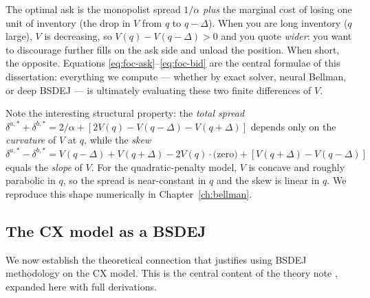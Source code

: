 \begin{intuition}
The optimal ask is the monopolist spread $1/\alpha$ \emph{plus} the marginal cost of losing one unit of inventory (the drop in $V$ from $q$ to $q - \Delta$). When you are long inventory ($q$ large), $V$ is decreasing, so $V(q) - V(q - \Delta) > 0$ and you quote \emph{wider}: you want to discourage further fills on the ask side and unload the position. When short, the opposite. Equations \eqref{eq:foc-ask}--\eqref{eq:foc-bid} are the central formulae of this dissertation: everything we compute --- whether by exact solver, neural Bellman, or deep BSDEJ --- is ultimately evaluating these two finite differences of $V$.

\medskip

Note the interesting structural property: the \emph{total spread} $\delta^{a, *} + \delta^{b, *} = 2/\alpha + [2V(q) - V(q - \Delta) - V(q + \Delta)]$ depends only on the \emph{curvature} of $V$ at $q$, while the \emph{skew} $\delta^{a, *} - \delta^{b, *} = V(q - \Delta) + V(q + \Delta) - 2 V(q) \cdot \text{(zero)} + [V(q + \Delta) - V(q - \Delta)]$ equals the \emph{slope} of $V$. For the quadratic-penalty model, $V$ is concave and roughly parabolic in $q$, so the spread is near-constant in $q$ and the skew is linear in $q$. We reproduce this shape numerically in Chapter~\ref{ch:bellman}.
\end{intuition}

\subsection{The CX model as a BSDEJ}
\label{sec:cx-model-as-bsdej}

We now establish the theoretical connection that justifies using BSDEJ methodology on the CX model. This is the central content of the theory note \cite{garry2026bsdeconnection}, expanded here with full derivations.

